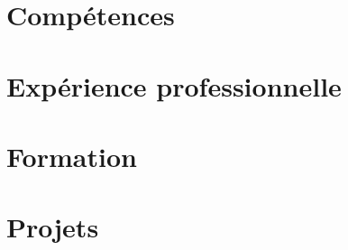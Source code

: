 \documentclass[10pt]{article}
\begin{document}
\pagestyle{others}\thispagestyle{first_page}



\section{Compétences}


\section{Expérience professionnelle}


\section{Formation}


\section{Projets}

\end{document}
